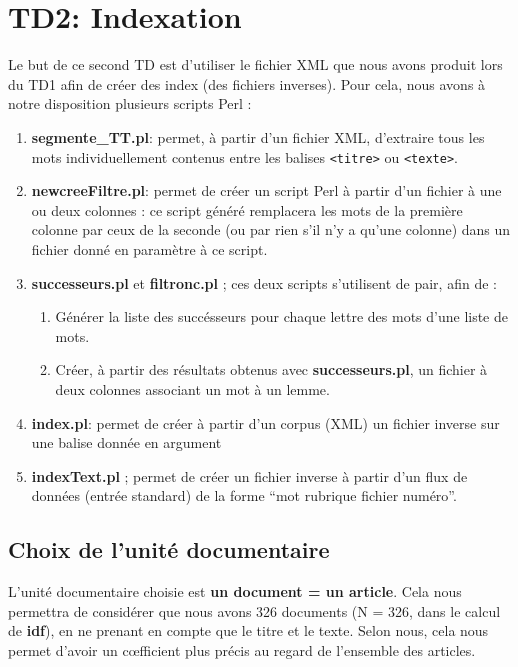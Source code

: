 \chapter{TD2: Indexation}

Le but de ce second TD est d'utiliser le fichier XML que nous avons produit lors du TD1 afin de créer des index (des fichiers inverses). Pour cela, nous avons à notre disposition plusieurs scripts Perl :

\begin{enumerate}
  \item \textbf{segmente\_TT.pl}: permet, à partir d'un fichier XML, d'extraire tous les mots individuellement contenus entre les balises \lstinline{<titre>} ou \lstinline{<texte>}.
  \item \textbf{newcreeFiltre.pl}: permet de créer un script Perl à partir d'un fichier à une ou deux colonnes : ce script généré remplacera les mots de la première colonne par ceux de la seconde (ou par rien s'il n'y a qu'une colonne) dans un fichier donné en paramètre à ce script.
  \item \textbf{successeurs.pl} et \textbf{filtronc.pl} ; ces deux scripts s'utilisent de pair, afin de :
  \begin{enumerate}
    \item Générer la liste des succésseurs pour chaque lettre des mots d'une liste de mots.
    \item Créer, à partir des résultats obtenus avec \textbf{successeurs.pl}, un fichier à deux colonnes associant un mot à un lemme.
  \end{enumerate}
  \item \textbf{index.pl}: permet de créer à partir d'un corpus (XML) un fichier inverse sur une balise donnée en argument
  \item \textbf{indexText.pl} ; permet de créer un fichier inverse à partir d'un flux de données (entrée standard) de la forme ``mot rubrique fichier numéro''.
\end{enumerate}

\section{Choix de l'unité documentaire}

L'unité documentaire choisie est \textbf{un document = un article}. Cela nous permettra de considérer que nous avons 326 documents (N = 326, dans le calcul de \textbf{idf}), en ne prenant en compte que le titre et le texte. Selon nous, cela nous permet d'avoir un c\oe{}fficient plus précis au regard de l'ensemble des articles.

